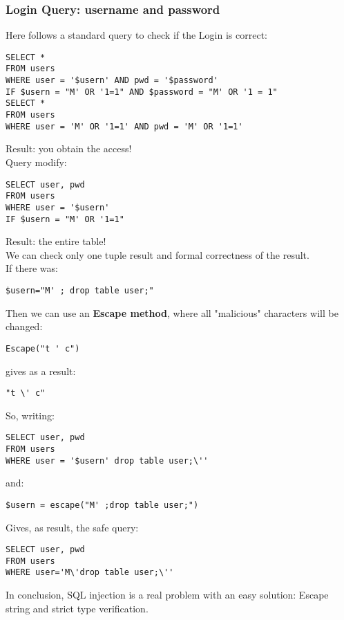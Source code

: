 \subsubsection{Login Query: username and password} 
Here follows a standard query to check if the Login is correct:
\begin{lstlisting}
SELECT * 
FROM users 
WHERE user = '$usern' AND pwd = '$password'
IF $usern = "M' OR '1=1" AND $password = "M' OR '1 = 1" 
SELECT * 
FROM users 
WHERE user = 'M' OR '1=1' AND pwd = 'M' OR '1=1'
\end{lstlisting}
Result: you obtain the access!\\
Query modify:
\begin{lstlisting}
SELECT user, pwd 
FROM users 
WHERE user = '$usern' 
IF $usern = "M' OR '1=1" 
\end{lstlisting}
Result: the entire table!\\
We can check only one tuple result and formal correctness of the result.\\
If there was:  
\begin{lstlisting} 
$usern="M' ; drop table user;"
\end{lstlisting}
Then we can use an \textbf{Escape method}, where all "malicious" characters will be changed:
\begin{lstlisting} 
Escape("t ' c") 
\end{lstlisting}
gives as a result:
\begin{lstlisting} 
"t \' c"
\end{lstlisting}
So, writing:
\begin{lstlisting} 
SELECT user, pwd 
FROM users 
WHERE user = '$usern' drop table user;\''
\end{lstlisting}
and:
\begin{lstlisting} 
$usern = escape("M' ;drop table user;")
\end{lstlisting}
Gives, as result, the safe query:
\begin{lstlisting} 
SELECT user, pwd 
FROM users 
WHERE user='M\'drop table user;\''
\end{lstlisting}
In conclusion, SQL injection is a real problem with an easy solution: Escape string and strict type verification.
